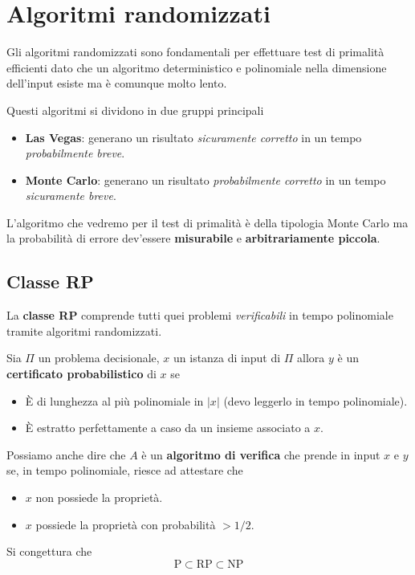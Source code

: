 \section{Algoritmi randomizzati}\label{algoritmi_random}
Gli algoritmi randomizzati sono fondamentali per effettuare test di primalit\`a efficienti dato che un algoritmo
deterministico e polinomiale nella dimensione dell'input esiste ma \`e comunque molto lento.

Questi algoritmi si dividono in due gruppi principali
\begin{itemize}
	\item \textbf{Las Vegas}: generano un risultato \emph{sicuramente corretto} in un tempo \emph{probabilmente breve}.
	\item \textbf{Monte Carlo}: generano un risultato \emph{probabilmente corretto} in un tempo \emph{sicuramente breve}.
\end{itemize}
L'algoritmo che vedremo per il test di primalit\`a \`e della tipologia Monte Carlo ma la probabilit\`a di errore
dev'essere \textbf{misurabile} e \textbf{arbitrariamente piccola}.

\subsection{Classe RP}
La \textbf{classe RP} comprende tutti quei problemi \emph{verificabili} in tempo polinomiale tramite algoritmi
randomizzati.

Sia $\Pi$ un problema decisionale, $x$ un istanza di input di $\Pi$ allora $y$ \`e un \textbf{certificato probabilistico}
di $x$ se
\begin{itemize}
	\item \`E di lunghezza al pi\`u polinomiale in $|x|$ (devo leggerlo in tempo polinomiale).
	\item \`E estratto perfettamente a caso da un insieme associato a $x$.
\end{itemize}
Possiamo anche dire che $A$ \`e un \textbf{algoritmo di verifica} che prende in input $x$ e $y$ se, in tempo polinomiale,
riesce ad attestare che
\begin{itemize}
	\item $x$ non possiede la propriet\`a.
	\item $x$ possiede la propriet\`a con probabilit\`a $> 1/2$.
\end{itemize}
Si congettura che
\[ \text{P} \subset \text{RP} \subset \text{NP} \]

